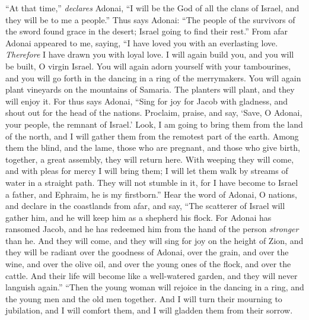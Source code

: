 \begin{biblechapter} %
\verse “At that time,” \textit{declares} Adonai, “I will be the God of all the clans of Israel, 
and they will be to me a people.”
\verse Thus says Adonai:
\verse “The people of the survivors of the sword found grace in the desert; 
Israel going to find their rest.”
\verse From afar Adonai appeared to me, saying, 
“I have loved you with an everlasting love. 
\textit{Therefore} I have drawn you with loyal love.
\verse I will again build you, 
and you will be built, O virgin Israel. 
You will again adorn yourself with your tambourines, 
and you will go forth in the dancing in a ring of the merrymakers.
\verse You will again plant vineyards on the mountains of Samaria. 
The planters will plant, and they will enjoy it.
\verse For thus says Adonai,
\verse “Sing for joy for Jacob with gladness, 
and shout out for the head of the nations. 
Proclaim, praise, and say, 
‘Save, O Adonai, your people, the remnant of Israel.’
\verse Look, I am going to bring them from the land of the north, 
and I will gather them from the remotest part of the earth. 
Among them the blind, and the lame, 
those who are pregnant, and those who give birth, 
together, a great assembly, 
they will return here.
\verse With weeping they will come, 
and with pleas for mercy I will bring them; 
I will let them walk by streams of water in a straight path. 
They will not stumble in it, 
for I have become to Israel a father, 
and Ephraim, he is my firstborn.”
\verse Hear the word of Adonai, O nations, 
and declare in the coastlands from afar, and say, 
“The scatterer of Israel will gather him, 
and he will keep him as a shepherd his flock.
\verse For Adonai has ransomed Jacob, 
and he has redeemed him from the hand of the person \textit{stronger} than he.
\verse And they will come, 
and they will sing for joy on the height of Zion, 
and they will be radiant over the goodness of Adonai, 
over the grain, and over the wine, and over the olive oil, 
and over the young ones of the flock, and over the cattle. 
And their life will become like a well-watered garden, 
and they will never languish again.”
\verse “Then the young woman will rejoice in the dancing in a ring, 
and the young men and the old men together. 
And I will turn their mourning to jubilation, 
and I will comfort them, 
and I will gladden them from their sorrow.

\end{biblechapter}
